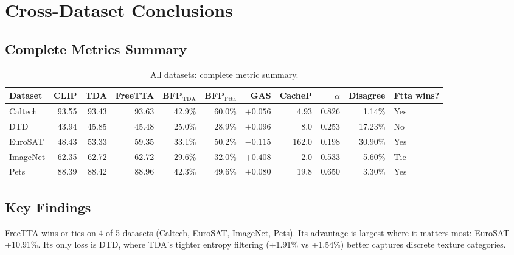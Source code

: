 \documentclass[12pt,a4paper]{article}
\newcommand{\1}{\mathbf{1}}
\begin{document}
\section{Cross-Dataset Conclusions}

\subsection{Complete Metrics Summary}

\begin{table}[H]
\centering
\caption{All datasets: complete metric summary.}
\label{tab:full_summary}
\setlength{\tabcolsep}{4pt}
\begin{tabular}{@{}lrrrrrrrrrl@{}}
\toprule
Dataset & CLIP & TDA & FreeTTA & BFP$_\text{TDA}$ & BFP$_\text{Ftta}$ & GAS & CacheP & $\overline{\alpha}$ & Disagree & Ftta wins? \\
\midrule
Caltech  & 93.55 & 93.43 & 93.63 & 42.9\% & 60.0\% & $+0.056$ & 4.93  & 0.826 & 1.14\%  & Yes \\
DTD      & 43.94 & 45.85 & 45.48 & 25.0\% & 28.9\% & $+0.096$ & 8.0   & 0.253 & 17.23\% & No \\
EuroSAT  & 48.43 & 53.33 & 59.35 & 33.1\% & 50.2\% & $-0.115$ & 162.0 & 0.198 & 30.90\% & Yes \\
ImageNet & 62.35 & 62.72 & 62.72 & 29.6\% & 32.0\% & $+0.408$ & 2.0   & 0.533 & 5.60\%  & Tie \\
Pets     & 88.39 & 88.42 & 88.96 & 42.3\% & 49.6\% & $+0.080$ & 19.8  & 0.650 & 3.30\%  & Yes \\
\bottomrule
\end{tabular}
\end{table}

\subsection{Key Findings}

\begin{tcolorbox}[findingbox, title={Finding 1: FreeTTA is the better default method.}]
FreeTTA wins or ties on 4 of 5 datasets (Caltech, EuroSAT, ImageNet, Pets).
Its advantage is largest where it matters most: EuroSAT +10.91\%.
Its only loss is DTD, where TDA's tighter entropy filtering (+1.91\% vs +1.54\%) better captures discrete texture categories.
\end{tcolorbox}
\end{document}
